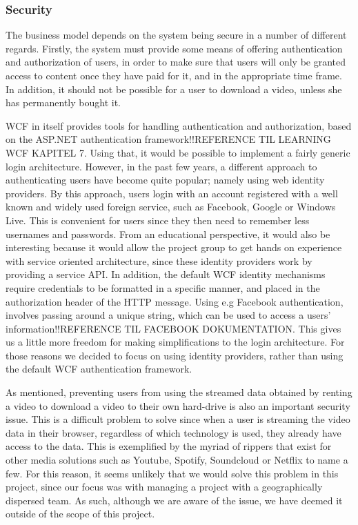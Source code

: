 \subsubsection{Security}
The business model depends on the system being secure in a number of different regards. Firstly, the system must provide some means of offering authentication and authorization of users, in order to make sure that users will only be granted access to content once they have paid for it, and in the appropriate time frame. In addition, it should not be possible for a user to download a video, unless she has permanently bought it.

WCF in itself provides tools for handling authentication and authorization, based on the ASP.NET authentication framework!!REFERENCE TIL LEARNING WCF KAPITEL 7. Using that, it would be possible to implement a fairly generic login architecture. However, in the past few years, a different approach to authenticating users have become quite popular; namely using web identity providers. By this approach, users login with an account registered with a well known and widely used foreign service, such as Facebook, Google or Windows Live. This is convenient for users since they then need to remember less usernames and passwords. From an educational perspective, it would also be interesting because it would allow the project group to get hands on experience with service oriented architecture, since these identity providers work by providing a service API. In addition, the default WCF identity mechanisms require credentials to be formatted in a specific manner, and placed in the authorization header of the HTTP message. Using e.g Facebook authentication, involves passing around a unique string, which can be used to access a users' information!!REFERENCE TIL FACEBOOK DOKUMENTATION. This gives us a little more freedom for making simplifications to the login architecture. For those reasons we decided to focus on using identity providers, rather than using the default WCF authentication framework.


As mentioned, preventing users from using the streamed data obtained by renting a video to download a video to their own hard-drive is also an important security issue. This is a difficult problem to solve since when a user is streaming the video data in their browser, regardless of which technology is used, they already have access to the data. This is exemplified by the myriad of rippers that exist for other media solutions such as Youtube, Spotify, Soundcloud or Netflix to name a few. For this reason, it seems unlikely that we would solve this problem in this project, since our focus was with managing a project with a geographically dispersed team. As such, although we are aware of the issue, we have deemed it outside of the scope of this project.

